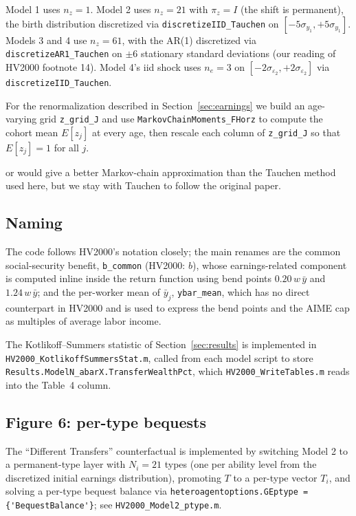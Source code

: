 \documentclass[11pt,fleqn]{article}
\begin{document}
Model 1 uses $n_z=1$. Model 2 uses $n_z=21$ with $\pi_z=I$ (the shift is permanent), the birth distribution discretized via \verb|discretizeIID_Tauchen| on $[-5\sigma_{y_1}, +5\sigma_{y_1}]$. Models 3 and 4 use $n_z=61$, with the AR(1) discretized via \verb|discretizeAR1_Tauchen| on $\pm 6$ stationary standard deviations (our reading of HV2000 footnote 14). Model 4's iid shock uses $n_e=3$ on $[-2\sigma_{\varepsilon_2}, +2\sigma_{\varepsilon_2}]$ via \verb|discretizeIID_Tauchen|.

For the renormalization described in Section~\ref{sec:earnings} we build an age-varying grid \verb|z_grid_J| and use \verb|MarkovChainMoments_FHorz| to compute the cohort mean $E[z_j]$ at every age, then rescale each column of \verb|z_grid_J| so that $E[z_j]=1$ for all $j$.

\cite*{TanakaToda2013} or \cite*{FarmerToda2017} would give a better Markov-chain approximation than the Tauchen method used here, but we stay with Tauchen to follow the original paper.

\subsection*{Naming}

The code follows HV2000's notation closely; the main renames are the common social-security benefit, \verb|b_common| (HV2000: $b$), whose earnings-related component is computed inline inside the return function using bend points $0.20\, w\, \bar{y}$ and $1.24\, w\, \bar{y}$; and the per-worker mean of $\bar{y}_j$, \verb|ybar_mean|, which has no direct counterpart in HV2000 and is used to express the bend points and the AIME cap as multiples of average labor income.

The Kotlikoff--Summers statistic of Section~\ref{sec:results} is implemented in \texttt{HV2000\_KotlikoffSummersStat.m}, called from each model script to store \texttt{Results.ModelN\_abarX.TransferWealthPct}, which \texttt{HV2000\_WriteTables.m} reads into the Table~4 column.

\subsection*{Figure 6: per-type bequests}

The ``Different Transfers'' counterfactual is implemented by switching Model 2 to a permanent-type layer with $N_i = 21$ types (one per ability level from the discretized initial earnings distribution), promoting $T$ to a per-type vector $T_i$, and solving a per-type bequest balance via \verb|heteroagentoptions.GEptype = {'BequestBalance'}|; see \texttt{HV2000\_Model2\_ptype.m}.
\end{document}
